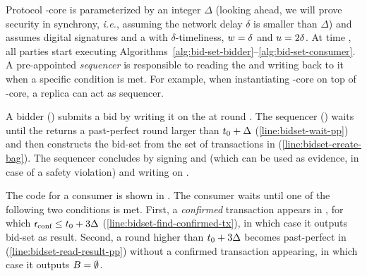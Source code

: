 \begin{protocol}\label{const:bidset}
	Protocol \bidsettm-core is parameterized by an integer $\Delta$ (looking ahead, we will prove security in synchrony, \textit{i.e.}, assuming the network delay $\delta$ is smaller than $\Delta$) and assumes digital signatures and a \podtm with $\delta$-timeliness, $w=\delta$ and $u=2\delta$. At time \tzero, all parties start executing Algorithms~\ref{alg:bid-set-bidder}--\ref{alg:bid-set-consumer}.
	A pre-appointed \emph{sequencer} is responsible to reading the \podtm and writing back to it when a specific condition is met. For example, when instantiating \bidsettm-core on top of \podtm-core, a replica can act as sequencer.
\end{protocol}

\vspace{-5mm}

\vspace{-5mm}

\vspace{-5mm}

\vspace{-5mm}

A bidder () submits a bid by writing it on the \podtm  at round \tzero.
The sequencer () waits until the \podtm returns a past-perfect round larger than $t_0 + \Delta$ (\cref{line:bidset-wait-pp}) and then constructs the bid-set \bag from the set of transactions in \txSet (\cref{line:bidset-create-bag}).
The sequencer concludes by signing \bag and \bidcert (which can be used as evidence, in case of a safety violation) and writing  \msgbidresult{(\bag, \bidcert, \sigma)} on \podInst.

The code for a consumer is shown in . The consumer waits until one of the following two conditions is met.
First, a \emph{confirmed} transaction \msgbidresult{(\bag, \bidcert, \sigma)} appears in \txSet , for which $\textsf{r}_\text{conf} \leq t_0 + 3 \Delta$ (\cref{line:bidset-find-confirmed-tx}), in which case it outputs bid-set \bag as result.
Second, a round higher than $t_0 + 3 \Delta$ becomes past-perfect in \podtm (\cref{line:bidset-read-result-pp}) without a confirmed \msgbidresult{} transaction appearing, in which case it outputs $B=\emptyset$.


